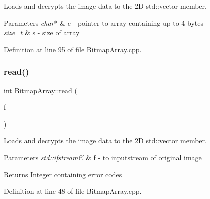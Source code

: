 Loads and decrypts the image data to the 2D std\+::vector member. 


\begin{DoxyParams}{Parameters}
{\em char$\ast$} & c -\/ pointer to array containing up to 4 bytes \\
\hline
{\em size\+\_\+t} & s -\/ size of array \\
\hline
\end{DoxyParams}


Definition at line 95 of file Bitmap\+Array.\+cpp.

\mbox{\label{classBitmapArray_a3a5834d03cd095769b422d4d66b9435f}} 
\subsubsection{\texorpdfstring{read()}{read()}}
{\footnotesize\ttfamily int Bitmap\+Array\+::read (\begin{DoxyParamCaption}\item[{std\+::ifstream \&}]{f }\end{DoxyParamCaption})\hspace{0.3cm}{\ttfamily [private]}}



Loads and decrypts the image data to the 2D std\+::vector member. 


\begin{DoxyParams}{Parameters}
{\em std\+::ifstream\&} & f -\/ to inputstream of original image \\
\hline
\end{DoxyParams}
\begin{DoxyReturn}{Returns}
Integer containing error codes 
\end{DoxyReturn}


Definition at line 48 of file Bitmap\+Array.\+cpp.

